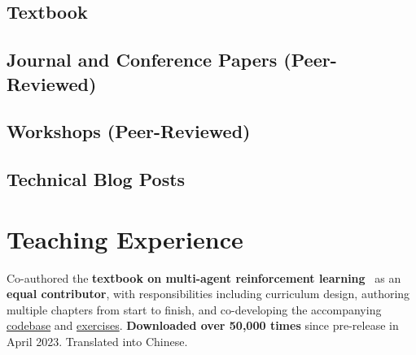\documentclass[a4paper,12pt]{article}
\begin{document}
\subsection{Textbook}
\printbibliography[heading=none, type=book, notkeyword=skip]

\subsection{Journal and Conference Papers (Peer-Reviewed)}
\printbibliography[heading=none, filter=conf_jour, notkeyword=skip]

\subsection{Workshops (Peer-Reviewed)}
\printbibliography[heading=none, keyword=workshop, notkeyword=skip]

\subsection{Technical Blog Posts}
\printbibliography[heading=none, keyword=blog, notkeyword=skip]


\expspace


\section{Teaching Experience}

\begin{expblock}
    Co-authored the \textbf{textbook on multi-agent reinforcement learning}~\cite{albrecht2024multi} as an \textbf{equal contributor}, with responsibilities including curriculum design, authoring multiple chapters from start to finish, and co-developing the accompanying \href{https://github.com/marl-book/codebase}{codebase} and \href{https://github.com/marl-book/marl-book-exercises}{exercises}. \textbf{Downloaded over 50,000 times} since pre-release in April 2023. Translated into Chinese.
\end{expblock}
\end{document}
